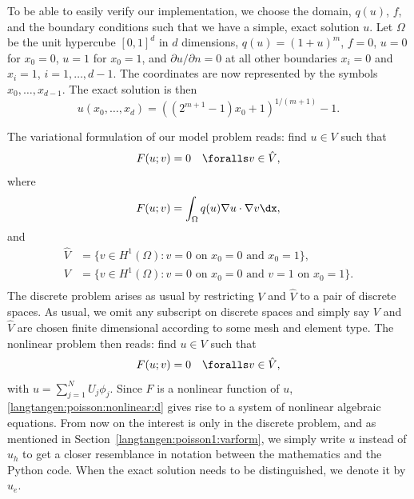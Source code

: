 To be able to easily verify our implementation, we choose the domain,
$q(u)$, $f$, and the boundary conditions such that we have a simple,
exact solution $u$. Let $\Omega$ be the unit hypercube $[0, 1]^d$ in
$d$ dimensions, $q(u)=(1+u)^m$, $f=0$, $u=0$ for $x_0=0$, $u=1$ for
$x_0=1$, and $\partial u/\partial n=0$ at all other boundaries $x_i=0$
and $x_i=1$, $i=1,\ldots,d-1$. The coordinates are now represented by
the symbols $x_0,\ldots,x_{d-1}$. The exact solution is then
\begin{equation}
u(x_0,\ldots,x_d) = \left((2^{m+1}-1)x_0 + 1\right)^{1/(m+1)} - 1.
\end{equation}

The variational formulation of our model problem reads:
find $u \in V$ such that
\begin{equation} \label{langtangen:poisson:nonlinear1}
  F(u; v) = 0 \quad \foralls v \in \hat{V},
\end{equation}
where
\begin{equation}
\label{langtangen:poisson:nonlinear2}
F(u; v) = \int_\Omega q(u)\nabla u\cdot \nabla v\dx,
\end{equation}
and
\begin{equation}
  \begin{split}
    \hat{V} &= \{v \in H^1(\Omega) : v = 0 \mbox{ on } x_0=0\mbox{ and }x_0=1\}, \\
     V      &= \{v \in H^1(\Omega) : v = 0 \mbox{ on } x_0=0\mbox{ and } v = 1\mbox{ on }x_0=1\}. \\
  \end{split}
\end{equation}
The discrete problem arises as usual by restricting $V$ and $\hat V$
to a pair of discrete spaces. As usual, we omit any subscript on
discrete spaces and simply say $V$ and $\hat V$ are chosen finite
dimensional according to some mesh and element type.  The nonlinear
problem then reads: find $u\in V$ such that
\begin{equation}
  F(u; v) = 0 \quad \foralls v \in \hat{V},
\label{langtangen:poisson:nonlinear:d}
\end{equation}
with $u = \sum_{j=1}^N U_j \phi_j$. Since $F$ is a nonlinear function
of $u$, \eqref{langtangen:poisson:nonlinear:d} gives rise to a system
of nonlinear algebraic equations.  From now on the interest is only in
the discrete problem, and as mentioned in
Section~\ref{langtangen:poisson1:varform}, we simply write $u$ instead
of $u_h$ to get a closer resemblance in notation between the mathematics and the
Python code. When the exact solution needs to be distinguished, we
denote it by $u_e$.

